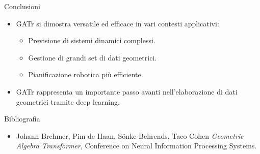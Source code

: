 \begin{frame}{Conclusioni}
    \begin{itemize}
        \item GATr si dimostra versatile ed efficace in vari contesti applicativi:
        \begin{itemize}
            \item Previsione di sistemi dinamici complessi.
            \item Gestione di grandi set di dati geometrici.
            \item Pianificazione robotica più efficiente.
        \end{itemize}
        \item GATr rappresenta un importante passo avanti nell'elaborazione di 
        dati geometrici tramite deep learning.
    \end{itemize}
\end{frame}
\begin{frame}{Bibliografia}
   \begin{itemize}
       \item Johann Brehmer, Pim de Haan, Sönke Behrends, Taco Cohen
           \emph{Geometric Algebra Transformer},
           Conference on Neural Information Processing Systems.
   \end{itemize} 
\end{frame}
